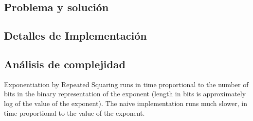 \subsection*{Problema y solución}

\subsection*{Detalles de Implementación}

\subsection*{Análisis de complejidad}

Exponentiation by Repeated Squaring runs in time proportional to the number of
bits in the binary representation of the exponent (length in bits is
approximately log of the value of the exponent). The naive implementation runs
much slower, in time proportional to the value of the exponent.